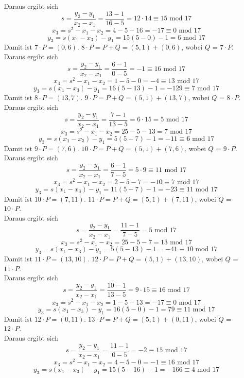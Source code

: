 Daraus ergibt sich 
$$s = \frac{y_2 - y_1}{x_2 -x_1} = \frac{13 - 1}{16 - 5} = 12 \cdot 14 \equiv 15 \text{ mod } 17$$
$$x_3 = s^2 - x_1 - x_2 = 4 - 5 - 16 = - 17 \equiv 0 \text{ mod } 17$$
$$y_3 = s(x_1 - x_3) - y_1 = 15(5 - 0) - 1 = 6 \text{ mod } 17$$
Damit ist $7 \cdot P = (0, 6)$. $8 \cdot P = P + Q = (5, 1) + (0, 6)$, wobei $Q$ = $7 \cdot P$.\\
Daraus ergibt sich 
$$s = \frac{y_2 - y_1}{x_2 -x_1} = \frac{6 - 1}{0 - 5} = -1 \equiv 16 \text{ mod } 17$$
$$x_3 = s^2 - x_1 - x_2 = 1 - 5 - 0 = -4 \equiv 13 \text{ mod } 17$$
$$y_3 = s(x_1 - x_3) - y_1 = 16(5 - 13) - 1 = - 129 \equiv 7 \text{ mod } 17$$
Damit ist $8 \cdot P = (13, 7)$. $9 \cdot P = P + Q = (5, 1) + (13, 7)$, wobei $Q$ = $8 \cdot P$.\\
Daraus ergibt sich 
$$s = \frac{y_2 - y_1}{x_2 -x_1} = \frac{7 - 1}{13 - 5} = 6 \cdot 15 = 5 \text{ mod } 17$$
$$x_3 = s^2 - x_1 - x_2 = 25 - 5 - 13 = 7 \text{ mod } 17$$
$$y_3 = s(x_1 - x_3) - y_1 = 5(5 - 7) - 1 = - 11 \equiv 6 \text{ mod } 17$$
Damit ist $9 \cdot P = (7, 6)$. $10 \cdot P = P + Q = (5, 1) + (7, 6)$, wobei $Q$ = $9 \cdot P$.\\
Daraus ergibt sich 
$$s = \frac{y_2 - y_1}{x_2 -x_1} = \frac{6 - 1}{7 - 5} = 5 \cdot 9 \equiv 11 \text{ mod } 17$$
$$x_3 = s^2 - x_1 - x_2 = 2 - 5 - 7 = -10 \equiv 7 \text{ mod } 17$$
$$y_3 = s(x_1 - x_3) - y_1 = 11(5 - 7) - 1 = - 23 \equiv 11 \text{ mod } 17$$
Damit ist $10 \cdot P = (7, 11)$. $11 \cdot P = P + Q = (5, 1) + (7, 11)$, wobei $Q$ = $10 \cdot P$.\\
Daraus ergibt sich 
$$s = \frac{y_2 - y_1}{x_2 -x_1} = \frac{11 - 1}{7 - 5} = 5 \text{ mod } 17$$
$$x_3 = s^2 - x_1 - x_2 = 25 - 5 - 7 = 13 \text{ mod } 17$$
$$y_3 = s(x_1 - x_3) - y_1 = 5(5 - 13) - 1 = - 41 \equiv 10 \text{ mod } 17$$
Damit ist $11 \cdot P = (13, 10)$. $12 \cdot P = P + Q = (5, 1) + (13, 10)$, wobei $Q$ = $11 \cdot P$.\\
Daraus ergibt sich 
$$s = \frac{y_2 - y_1}{x_2 -x_1} = \frac{10 - 1}{13 - 5} = 9 \cdot 15 \equiv 16 \text{ mod } 17$$
$$x_3 = s^2 - x_1 - x_2 = 1 - 5 - 13 = - 17 \equiv 0 \text{ mod } 17$$
$$y_3 = s(x_1 - x_3) - y_1 = 16(5 - 0) - 1 = 79 \equiv 11 \text{ mod } 17$$
Damit ist $12 \cdot P = (0, 11)$. $13 \cdot P = P + Q = (5, 1) + (0, 11)$, wobei $Q$ = $12 \cdot P$.\\
Daraus ergibt sich 
$$s = \frac{y_2 - y_1}{x_2 -x_1} = \frac{11 - 1}{0 - 5} = - 2 \equiv 15 \text{ mod } 17$$
$$x_3 = s^2 - x_1 - x_2 = 4 - 5 - 0 = - 1 \equiv 16 \text{ mod } 17$$
$$y_3 = s(x_1 - x_3) - y_1 = 15(5 - 16) - 1 = - 166 \equiv 4 \text{ mod } 17$$
